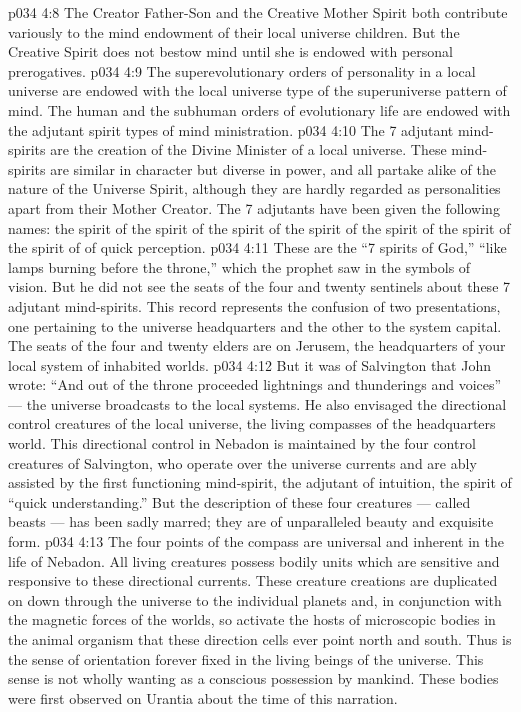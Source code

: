 \vs p034 4:8 \pc The Creator Father\hyp{}Son and the Creative Mother Spirit both contribute variously to the mind endowment of their local universe children. But the Creative Spirit does not bestow mind until she is endowed with personal prerogatives.
\vs p034 4:9 The superevolutionary orders of personality in a local universe are endowed with the local universe type of the superuniverse pattern of mind. The human and the subhuman orders of evolutionary life are endowed with the adjutant spirit types of mind ministration.
\vs p034 4:10 \pc The 7 adjutant mind\hyp{}spirits are the creation of the Divine Minister of a local universe. These mind\hyp{}spirits are similar in character but diverse in power, and all partake alike of the nature of the Universe Spirit, although they are hardly regarded as personalities apart from their Mother Creator. The 7 adjutants have been given the following names: the spirit of  the spirit of  the spirit of  the spirit of  the spirit of  the spirit of  the spirit of  of quick perception.
\vs p034 4:11 \pc These are the “7 spirits of God,” “like lamps burning before the throne,” which the prophet saw in the symbols of vision. But he did not see the seats of the four and twenty sentinels about these 7 adjutant mind\hyp{}spirits. This record represents the confusion of two presentations, one pertaining to the universe headquarters and the other to the system capital. The seats of the four and twenty elders are on Jerusem, the headquarters of your local system of inhabited worlds.
\vs p034 4:12 But it was of Salvington that John wrote: “And out of the throne proceeded lightnings and thunderings and voices” --- the universe broadcasts to the local systems. He also envisaged the directional control creatures of the local universe, the living compasses of the headquarters world. This directional control in Nebadon is maintained by the four control creatures of Salvington, who operate over the universe currents and are ably assisted by the first functioning mind\hyp{}spirit, the adjutant of intuition, the spirit of “quick understanding.” But the description of these four creatures --- called beasts --- has been sadly marred; they are of unparalleled beauty and exquisite form.
\vs p034 4:13 The four points of the compass are universal and inherent in the life of Nebadon. All living creatures possess bodily units which are sensitive and responsive to these directional currents. These creature creations are duplicated on down through the universe to the individual planets and, in conjunction with the magnetic forces of the worlds, so activate the hosts of microscopic bodies in the animal organism that these direction cells ever point north and south. Thus is the sense of orientation forever fixed in the living beings of the universe. This sense is not wholly wanting as a conscious possession by mankind. These bodies were first observed on Urantia about the time of this narration.
